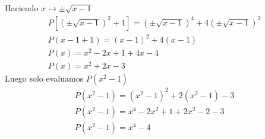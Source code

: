 \begin{section-problem}
\begin{solution}[2]
                Haciendo $x \rightarrow \pm \sqrt{x - 1}$
                \begin{gather*}
                    P\left[ \left(\pm \sqrt{x - 1}\right)^2 + 1 \right] = \left(\pm \sqrt{x - 1}\right)^4 + 4 \left(\pm \sqrt{x - 1}\right)^2 \\
                    P\left( x - 1 + 1 \right) = \left(x - 1\right)^2 + 4 \left(x - 1\right)\\
                    P\left( x \right) = x^2 - 2 x + 1 + 4 x - 4\\
                    P\left( x \right) = x^2 + 2x - 3
                \end{gather*}
                Luego solo evaluamos $P(x^2 - 1)$
                \begin{gather*}
                    P\left( x^2 - 1 \right) = \left(x^2 - 1\right)^2 + 2\left(x^2 - 1\right) - 3\\
                    P\left( x^2 - 1 \right) = x^4 - 2 x^2 + 1 + 2 x^2 - 2 - 3\\
                    P\left( x^2 - 1 \right) = \boxed{x^4 - 4}
                \end{gather*}
            \end{solution}

        \end{section-problem}

